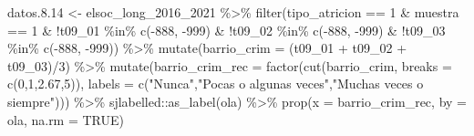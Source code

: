 \documentclass[
  12pt,
]{book}
\newenvironment{Shaded}{\begin{snugshade}}{\end{snugshade}}
\newcommand{\AttributeTok}[1]{\textcolor[rgb]{0.77,0.63,0.00}{#1}}
\newcommand{\ConstantTok}[1]{\textcolor[rgb]{0.00,0.00,0.00}{#1}}
\newcommand{\DecValTok}[1]{\textcolor[rgb]{0.00,0.00,0.81}{#1}}
\newcommand{\FloatTok}[1]{\textcolor[rgb]{0.00,0.00,0.81}{#1}}
\newcommand{\FunctionTok}[1]{\textcolor[rgb]{0.00,0.00,0.00}{#1}}
\newcommand{\NormalTok}[1]{#1}
\newcommand{\OtherTok}[1]{\textcolor[rgb]{0.56,0.35,0.01}{#1}}
\newcommand{\SpecialCharTok}[1]{\textcolor[rgb]{0.00,0.00,0.00}{#1}}
\newcommand{\StringTok}[1]{\textcolor[rgb]{0.31,0.60,0.02}{#1}}
\begin{document}
\begin{Shaded}
\begin{Highlighting}[]
\NormalTok{datos.}\FloatTok{8.14} \OtherTok{\textless{}{-}}\NormalTok{ elsoc\_long\_2016\_2021 }\SpecialCharTok{\%\textgreater{}\%} 
  \FunctionTok{filter}\NormalTok{(tipo\_atricion }\SpecialCharTok{==} \DecValTok{1} \SpecialCharTok{\&}\NormalTok{ muestra }\SpecialCharTok{==} \DecValTok{1} \SpecialCharTok{\&}
           \SpecialCharTok{!}\NormalTok{t09\_01 }\SpecialCharTok{\%in\%} \FunctionTok{c}\NormalTok{(}\SpecialCharTok{{-}}\DecValTok{888}\NormalTok{, }\SpecialCharTok{{-}}\DecValTok{999}\NormalTok{) }\SpecialCharTok{\&} \SpecialCharTok{!}\NormalTok{t09\_02 }\SpecialCharTok{\%in\%} \FunctionTok{c}\NormalTok{(}\SpecialCharTok{{-}}\DecValTok{888}\NormalTok{, }\SpecialCharTok{{-}}\DecValTok{999}\NormalTok{) }\SpecialCharTok{\&} \SpecialCharTok{!}\NormalTok{t09\_03 }\SpecialCharTok{\%in\%} \FunctionTok{c}\NormalTok{(}\SpecialCharTok{{-}}\DecValTok{888}\NormalTok{, }\SpecialCharTok{{-}}\DecValTok{999}\NormalTok{)) }\SpecialCharTok{\%\textgreater{}\%} 
  \FunctionTok{mutate}\NormalTok{(}\AttributeTok{barrio\_crim =}\NormalTok{ (t09\_01 }\SpecialCharTok{+}\NormalTok{ t09\_02 }\SpecialCharTok{+}\NormalTok{ t09\_03)}\SpecialCharTok{/}\DecValTok{3}\NormalTok{) }\SpecialCharTok{\%\textgreater{}\%} 
  \FunctionTok{mutate}\NormalTok{(}\AttributeTok{barrio\_crim\_rec =} \FunctionTok{factor}\NormalTok{(}\FunctionTok{cut}\NormalTok{(barrio\_crim, }\AttributeTok{breaks =} \FunctionTok{c}\NormalTok{(}\DecValTok{0}\NormalTok{,}\DecValTok{1}\NormalTok{,}\FloatTok{2.67}\NormalTok{,}\DecValTok{5}\NormalTok{)),}
                                  \AttributeTok{labels =} \FunctionTok{c}\NormalTok{(}\StringTok{"Nunca"}\NormalTok{,}\StringTok{"Pocas o algunas veces"}\NormalTok{,}\StringTok{"Muchas veces o siempre"}\NormalTok{))) }\SpecialCharTok{\%\textgreater{}\%}
\NormalTok{  sjlabelled}\SpecialCharTok{::}\FunctionTok{as\_label}\NormalTok{(ola) }\SpecialCharTok{\%\textgreater{}\%} 
  \FunctionTok{prop}\NormalTok{(}\AttributeTok{x =}\NormalTok{ barrio\_crim\_rec, }\AttributeTok{by =}\NormalTok{ ola, }\AttributeTok{na.rm =} \ConstantTok{TRUE}\NormalTok{)}


\end{Highlighting}
\end{Shaded}
\end{document}
